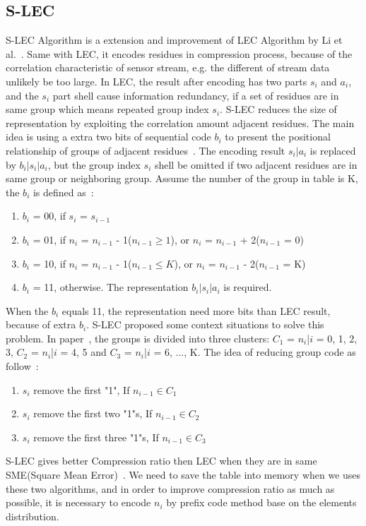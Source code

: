 \subsection{S-LEC}
S-LEC Algorithm is a extension and improvement of LEC Algorithm by Li et
al.~\cite{li2016temporal}. Same with LEC, it encodes residues in compression
process, because of the correlation characteristic of sensor stream, e.g. the
different of stream data unlikely be too large. In LEC, the result after
encoding has two parts $s_i$ and $ a_i$, and the $s_i$ part shell cause
information redundancy, if a set of residues are in same group which means
repeated group index $s_i$. S-LEC reduces the size of representation by
exploiting the correlation amount adjacent residues. The main idea is using a
extra two bits of sequential code $b_i$ to present the positional relationship
of groups of adjacent residues~\cite{li2016temporal}. The encoding result
$s_i|a_i$ is replaced by $b_i|s_i|a_i$, but the group index $s_i$ shell be
omitted if two adjacent residues are in same group or neighboring group. Assume
the number of the group in table is K, the $b_i$ is defined
as~\cite{li2016temporal}: 

\begin{enumerate}
    \item $b_i$ = 00, if $s_i$ = $s_{i-1}$
    \item $b_i$ = 01, if $n_i$ = $n_{i-1}$ - 1($n_{i-1} \geqslant 1$), or $n_i$
    = $n_{i-1}$ + 2($n_{i-1}$ = 0)
    \item $b_i$ = 10, if $n_i$ = $n_{i-1}$ - 1($n_{i-1} \leqslant K$), or $n_i$
    = $n_{i-1}$ - 2($n_{i-1}$ = K)
    \item $b_i$ = 11, otherwise. The representation $b_i|s_i|a_i$ is required. 
  \end{enumerate}

When the $b_i$ equals 11, the representation need more bits than LEC result,
because of extra $b_i$. S-LEC proposed some context situations to solve this
problem. In paper~\cite{li2016temporal}, the groups is divided into three
clusters: $C_1$ = {$n_i$|$i$ = 0, 1, 2, 3}, $C_2$ = {$n_i$|$i$ = 4, 5} and 
$C_3$ = {$n_i$|$i$ = 6, ..., K}. The idea of reducing group code as
follow~\cite{li2016temporal}:

\begin{enumerate}
    \item $s_i$ remove the first "1", If $n_{i-1} \in C_1$
    \item $s_i$ remove the first two "1"s, If $n_{i-1} \in C_2$
    \item $s_i$ remove the first three "1"s, If $n_{i-1} \in C_3$
\end{enumerate}
S-LEC gives better Compression ratio then LEC when they are in same SME(Square
Mean Error)~\cite{li2016temporal}. We need to save the table into memory when we
uses these two algorithms, and in order to improve compression ratio as much as
possible, it is necessary to encode $n_i$ by prefix code method base on the
elements distribution.

